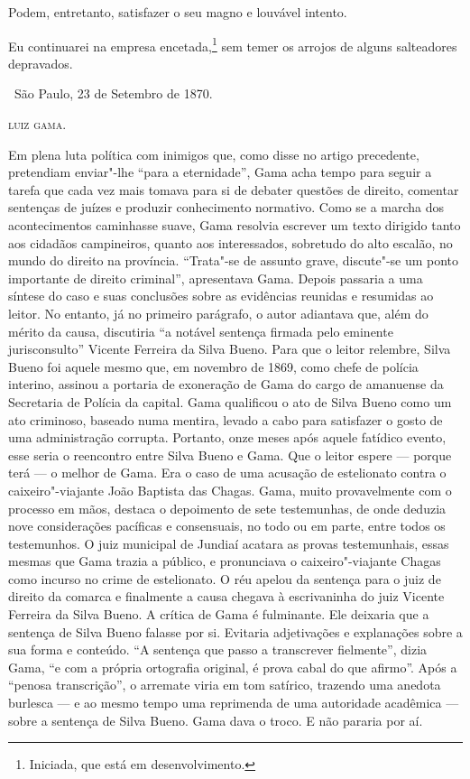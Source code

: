 Podem, entretanto, satisfazer o seu magno e louvável intento.

Eu continuarei na empresa encetada,\footnote{Iniciada, que está em
  desenvolvimento.} sem
temer os arrojos de alguns salteadores depravados.

\vfill

\hfill\ São Paulo, 23 de Setembro de 1870.

\hfill\textsc{luiz gama.}

\paginabranca
\mbox{}\vfill
\thispagestyle{empty}

{\small\noindent
Em plena luta política com inimigos que, como disse no artigo
precedente, pretendiam enviar"-lhe ``para a eternidade'', Gama acha tempo
para seguir a tarefa que cada vez mais tomava para si de debater
questões de direito, comentar sentenças de juízes e produzir
conhecimento normativo. Como se a marcha dos acontecimentos caminhasse
suave, Gama resolvia escrever um texto dirigido
tanto aos cidadãos campineiros, quanto aos
interessados, sobretudo do alto escalão, no mundo do direito na
província. ``Trata"-se de assunto grave, discute"-se um ponto importante de
direito criminal'', apresentava Gama. Depois passaria a uma síntese do
caso e suas conclusões sobre as evidências reunidas e resumidas ao
leitor. No entanto, já no primeiro parágrafo, o autor adiantava que,
além do mérito da causa, discutiria ``a notável sentença firmada pelo
eminente jurisconsulto'' Vicente Ferreira da Silva Bueno. Para que o
leitor relembre, Silva Bueno foi aquele mesmo que, em novembro de 1869,
como chefe de polícia interino, assinou a portaria de exoneração de Gama
do cargo de amanuense da Secretaria de Polícia da capital. Gama
qualificou o ato de Silva Bueno como um ato criminoso, baseado numa
mentira, levado a cabo para satisfazer o gosto de uma administração
corrupta. Portanto, onze meses após aquele fatídico evento, esse seria o
reencontro entre Silva Bueno e Gama. Que o leitor espere --- porque terá
--- o melhor de Gama. Era o caso de uma acusação de estelionato contra o
caixeiro"-viajante João Baptista das Chagas. Gama, muito provavelmente
com o processo em mãos, destaca o depoimento de sete testemunhas, de
onde deduzia nove considerações
pacíficas e consensuais, no todo ou em parte, entre todos os
testemunhos. O juiz municipal de Jundiaí acatara as
provas testemunhais, essas mesmas que Gama trazia a público, e
pronunciava o caixeiro"-viajante Chagas como incurso no crime de
estelionato. O réu apelou da sentença para o juiz de direito da comarca
e finalmente a causa chegava à escrivaninha do juiz Vicente Ferreira da
Silva Bueno. A crítica de Gama é fulminante. Ele deixaria que a sentença
de Silva Bueno falasse por si. Evitaria adjetivações e explanações sobre
a sua forma e conteúdo. ``A sentença que passo a transcrever fielmente'',
dizia Gama, ``e com a própria ortografia original, é prova cabal do que
afirmo''. Após a ``penosa transcrição'', o arremate viria em tom satírico,
trazendo uma anedota burlesca --- e ao mesmo tempo uma reprimenda de uma
autoridade acadêmica --- sobre a sentença de Silva Bueno. Gama dava o
troco. E não pararia por aí. }
\thispagestyle{empty}

